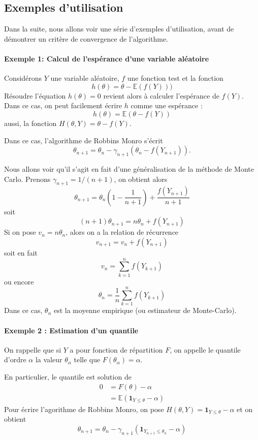 \documentclass[a4paper,12pt]{book}
\newcommand{\E}{\mathbb{E}}
\begin{document}
\subsection{Exemples d'utilisation}
Dans la suite, nous allons voir une série d'exemples d'utilisation, avant de démontrer un critère de convergence de l'algorithme.

\paragraph{Exemple 1: Calcul de l'espérance d'une variable aléatoire}

Considérons $Y$ une variable aléatoire, $f$ une fonction test et la fonction
$$h(\theta)=\theta-\E(f(Y)))$$
Résoudre l'équation $h(\theta)=0$ revient alors à calculer l'espérance de $f(Y)$.
Dans ce cas, on peut facilement écrire $h$ comme une espérance :
$$h(\theta)=\E(\theta-f(Y))$$
aussi, la fonction $H(\theta, Y)=\theta-f(Y)$.

Dans ce cas, l'algorithme de Robbins Monro s'écrit
$$\theta_{n+1}=\theta_n-\gamma_{n+1}(\theta_n-f(Y_{n+1})).$$

Nous allons voir qu'il s'agit en fait d'une généralisation de la méthode de Monte Carlo. Prenons $\gamma_{n+1}=1/(n+1)$, on obtient alors
$$\theta_{n+1}=\theta_{n}(1-\frac{1}{n+1}) +\frac{f(Y_{n+1})}{n+1}
$$
soit
$$(n+1)\theta_{n+1}=n\theta_n +f(Y_{n+1})$$
Si on pose $v_n=n\theta_n$, alors on a la relation de récurrence $$v_{n+1}=v_n+f(Y_{n+1})$$ soit en fait $$v_n=\sum_{k=1}^n f(Y_{k+1})$$
ou encore
$$\theta_n=\frac{1}{n}\sum_{k=1}^n f(Y_{k+1})$$
Dans ce cas, $\theta_n$ est la moyenne empirique (ou estimateur de Monte-Carlo).

\paragraph{Exemple 2 : Estimation d'un quantile}
On rappelle que si $Y$ a pour fonction de répartition $F$, on appelle le quantile d'ordre $\alpha$ la valeur $\theta_\alpha$ telle que $F(\theta_\alpha)=\alpha$.

En particulier, le quantile est solution de
\begin{align*}
0&=F(\theta)-\alpha\\
&= \E(\mathbf{1}_{Y\le \theta} -\alpha)
\end{align*}
Pour écrire l'agorithme de Robbins Monro, on pose $H(\theta, Y)=\mathbf{1}_{Y\le \theta} -\alpha$ et on obtient
$$\theta_{n+1}=\theta_n-\gamma_{n+1}(\mathbf{1}_{Y_{n+1}\le \theta_n} -\alpha)$$
\end{document}
